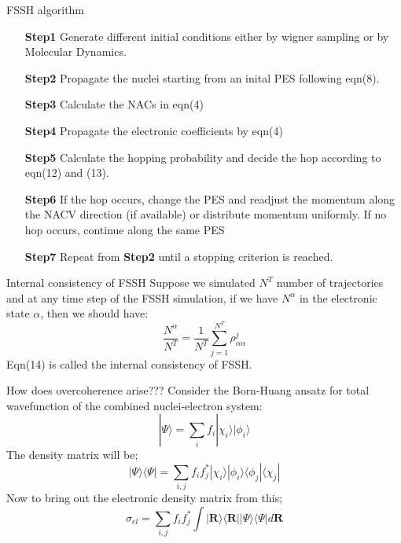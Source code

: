 \documentclass{beamer}
\begin{document}
	\begin{frame}[t]{FSSH algorithm}
	\begin{enumerate}
	\item[\textbf{Step1}]{Generate different initial conditions either by wigner sampling or by Molecular Dynamics.}
	\item[\textbf{Step2}]{Propagate the nuclei starting from an inital PES following eqn(8).}
	\item[\textbf{Step3}]{Calculate the NACs in eqn(4)}
	\item[\textbf{Step4}]{Propagate the electronic coefficients by eqn(4)}
	\item[\textbf{Step5}]{Calculate the hopping probability and decide the hop according to eqn(12) and (13).}
	\item[\textbf{Step6}]{If the hop occurs, change the PES and readjust the momentum along the NACV direction (if available) or distribute momentum uniformly. If no hop occurs, continue along the same PES}
	\item[\textbf{Step7}]{Repeat from \textbf{Step2} until a stopping criterion is reached.}
	\end{enumerate}		
	\end{frame}
	
	\begin{frame}[t]{Internal consistency of FSSH}
	Suppose we simulated $N^T$ number of trajectories and at any time step of the FSSH simulation, if we have $N^\alpha$ in the electronic state $\alpha$, then we should have:
    \begin{equation}
	\frac{N^\alpha}{N^T} = \frac{1}{N^T}\sum_{j=1}^{N^T} \rho_{\alpha\alpha}^j
	\end{equation}
	Eqn(14) is called the internal consistency of FSSH.
	
	\end{frame}
	
	\begin{frame}[t]{How does overcoherence arise???}
	Consider the Born-Huang ansatz for total wavefunction of the combined nuclei-electron system:
	\begin{equation}
	|\Psi\rangle = \sum_i f_i|\chi_i\rangle|\phi_i\rangle 
	\end{equation}
	The density matrix will be;
	\begin{equation}
	|\Psi\rangle\langle\Psi| = \sum_{i,j} f_if_j^*|\chi_i\rangle|\phi_i\rangle \langle\phi_j|\langle\chi_j|
	\end{equation}
	Now to bring out the electronic density matrix from this;
	\begin{equation}
	\sigma_{el} = \sum_{i,j} f_if_j^*\displaystyle\int|\textbf{R}\rangle\langle\textbf{R}||\Psi\rangle\langle\Psi| d\textbf{R}
	\end{equation}
	\end{frame}
\end{document}
